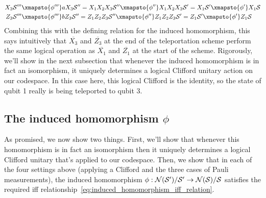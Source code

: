 \begin{example}
    \begin{align}
        X_3\SSS'''
        &\xmapsto{\phi'''} a X_3\SSS'' = X_1 X_2 X_3 \SSS''
        \xmapsto{\phi''} X_1 X_2 X_3 \SSS' = X_1 \SSS'
        \xmapsto{\phi'} X_1\SSS \\
        Z_3\SSS'''
        &\xmapsto{\phi'''} b Z_3\SSS'' = Z_1 Z_2 Z_3 \SSS''
        \xmapsto{\phi''} Z_1 Z_2 Z_3 \SSS' = Z_1 \SSS'
        \xmapsto{\phi'} Z_1\SSS \\
    \end{align}
    Combining this with the defining relation  for the induced homomorphism, this says intuitively that $\overline{X_3}$ and $\overline{Z_3}$ at the end of the teleportation scheme perform the same logical operation as $\overline{X_1}$ and $\overline{Z_1}$ at the start of the scheme.
    Rigorously, we'll show in the next subsection that whenever the induced homomorphism is in fact an isomorphism, it uniquely determines a logical Clifford unitary action on our codespace.
    In this case here, this logical Clifford is the identity, so the state of qubit 1 really is being teleported to qubit 3.
\end{example}

\subsection{The induced homomorphism $\phi$}\label{subsec:the-induced-homomorphism}

As promised, we now show two things.
First, we'll show that whenever this homomorphism is in fact an isomorphism then it uniquely determines a logical Clifford unitary that's applied to our codespace.
Then, we show that in each of the four settings above (applying a Clifford and the three cases of Pauli measurements), the induced homomorphism $\phi: \mathcal{N}(\mathcal{S}') / \mathcal{S}' \to \mathcal{N}(\mathcal{S}) / \mathcal{S}$ satisfies the required iff relationship~\eqref{eq:induced_homomorphism_iff_relation}.

